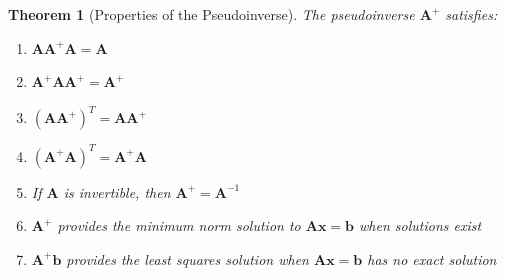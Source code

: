 \documentclass[12pt]{article}
\numberwithin{equation}{section}
\newcommand{\vect}[1]{\boldsymbol{#1}}   %
\newcommand{\mat}[1]{\mathbf{#1}}        %
\theoremstyle{plain}
\newtheorem{theorem}{Theorem}[section]
\theoremstyle{definition}
\theoremstyle{remark}
\begin{document}
\begin{theorem}[Properties of the Pseudoinverse]
The pseudoinverse $\mat{A}^+$ satisfies:
\begin{enumerate}
\item $\mat{A}\mat{A}^+\mat{A} = \mat{A}$
\item $\mat{A}^+\mat{A}\mat{A}^+ = \mat{A}^+$
\item $(\mat{A}\mat{A}^+)^T = \mat{A}\mat{A}^+$
\item $(\mat{A}^+\mat{A})^T = \mat{A}^+\mat{A}$
\item If $\mat{A}$ is invertible, then $\mat{A}^+ = \mat{A}^{-1}$
\item $\mat{A}^+$ provides the minimum norm solution to $\mat{A}\vect{x} = \vect{b}$ when solutions exist
\item $\mat{A}^+\vect{b}$ provides the least squares solution when $\mat{A}\vect{x} = \vect{b}$ has no exact solution
\end{enumerate}
\end{theorem}
\end{document}
